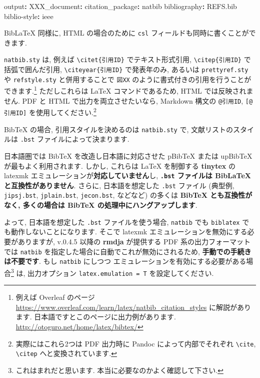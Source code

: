 \documentclass[
]{bxjsarticle}
\newenvironment{Shaded}{\begin{snugshade}}{\end{snugshade}}
\newcommand{\AttributeTok}[1]{\textcolor[rgb]{0.77,0.63,0.00}{#1}}
\newcommand{\FunctionTok}[1]{\textcolor[rgb]{0.00,0.00,0.00}{#1}}
\newcommand{\KeywordTok}[1]{\textcolor[rgb]{0.13,0.29,0.53}{\textbf{#1}}}
\begin{document}
\begin{Shaded}
\begin{Highlighting}[numbers=left,,]
\FunctionTok{output}\KeywordTok{:}
\AttributeTok{  }\FunctionTok{XXX\_document}\KeywordTok{:}
\AttributeTok{    }\FunctionTok{citation\_package}\KeywordTok{:}\AttributeTok{ natbib}
\FunctionTok{bibliography}\KeywordTok{:}\AttributeTok{ REFS.bib}
\FunctionTok{biblio{-}style}\KeywordTok{:}\AttributeTok{ ieee}
\end{Highlighting}
\end{Shaded}

BibLaTeX 同様に, HTML の場合のために \texttt{csl} フィールドも同時に書くことができます.

\texttt{natbib.sty} は, 例えば \texttt{\textbackslash{}citet\{引用ID\}} でテキスト形式引用, \texttt{\textbackslash{}citep\{引用ID\}} で括弧で囲んだ引用, \texttt{\textbackslash{}citeyear\{引用ID\}} で発表年のみ, あるいは \texttt{prettyref.sty} や \texttt{refstyle.sty} と併用することで \texttt{図XX} のように書式付きの引用を行うことができます.\footnote{例えば Overleaf のページ \url{https://www.overleaf.com/learn/latex/natbib_citation_styles} に解説があります. 日本語ですとこのページに出力例があります. \url{http://otoguro.net/home/latex/bibtex/}} ただしこれらは LaTeX コマンドであるため, HTML では反映されません. PDF と HTML で出力を両立させたいなら, Markdown 構文の \texttt{@引用ID}, \texttt{{[}@引用ID{]}} を使用してください.\footnote{実際にはこれら2つは PDF 出力時に Pandoc によって内部でそれぞれ \texttt{\textbackslash{}cite}, \texttt{\textbackslash{}citep} へと変換されています.}

BibTeX の場合, 引用スタイルを決めるのは \texttt{natbib.sty} で, 文献リストのスタイルは \texttt{.bst} ファイルによって決まります.

日本語圏では BibTeX を改造し日本語に対応させた pBibTeX または upBibTeX が最もよく利用されます. しかし, これらは LaTeX を制御する \textbf{tinytex} の latexmk エミュレーションが\textbf{対応していません}し, \textbf{\texttt{.bst} ファイルは BibLaTeX と互換性がありません}. さらに, 日本語を想定した \texttt{.bst} ファイル (典型例, \texttt{jipsj.bst}, \texttt{jplain.bst}, \texttt{jecon.bst}, などなど) の多くは \textbf{BibTeX とも互換性がなく, 多くの場合は BibTeX の処理中にハングアップします}.

よって, 日本語を想定した \texttt{.bst} ファイルを使う場合, \texttt{natbib} でも \texttt{biblatex} でも動作しないことになります. そこで latexmk エミュレーションを無効にする必要がありますが, v.0.4.5 以降の \textbf{rmdja} が提供する PDF 系の出力フォーマットでは \texttt{natbib} を指定した場合に自動でこれが無効にされるため, \textbf{手動での手続きは不要です}. もし \texttt{natbib} にしつつ エミュレーションを有効にする必要がある場合\footnote{これはまれだと思います. 本当に必要なのかよく確認して下さい.} は, 出力オプション \texttt{latex.emulation\ =\ T} を設定してください.
\end{document}
